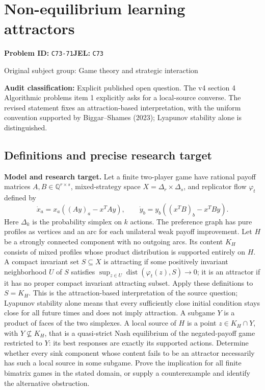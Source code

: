 \documentclass[11pt,a4paper]{article}
\begin{document}
\section*{Non-equilibrium learning attractors}
\textbf{Problem ID:} \texttt{C73-71}\quad \textbf{JEL:} \texttt{C73}\par
\label{problem:OP-0284}
{\sffamily\small\color{muted}Original subject group: Game theory and strategic interaction\par}
\label{definitions:problem:30007566}
\textbf{Audit classification:} Explicit published open question. The v4 section 4 Algorithmic problems item 1 explicitly asks for a local-source converse. The revised statement fixes an attraction-based interpretation, with the uniform convention supported by Biggar--Shames (2023); Lyapunov stability alone is distinguished.
\subsection*{Definitions and precise research target}
\textbf{Model and research target.} Let a finite two-player game have rational payoff matrices \(A,B\in\mathbb Q^{r\times s}\), mixed-strategy space \(X=\Delta_r\times\Delta_s\), and replicator flow \(\varphi_t\) defined by
\[
 \dot x_a=x_a((Ay)_a-x^TAy),\qquad
 \dot y_b=y_b((x^TB)_b-x^TBy).
\]
Here \(\Delta_k\) is the probability simplex on \(k\) actions. The preference graph has pure profiles as vertices and an arc for each unilateral weak payoff improvement. Let \(H\) be a strongly connected component with no outgoing arcs. Its content \(K_H\) consists of mixed profiles whose product distribution is supported entirely on \(H\). A compact invariant set \(S\subseteq X\) is attracting if some positively invariant neighborhood \(U\) of \(S\) satisfies \(\sup_{z\in U}\operatorname{dist}(\varphi_t(z),S)\to0\); it is an attractor if it has no proper compact invariant attracting subset. Apply these definitions to \(S=K_H\). This is the attraction-based interpretation of the source question; Lyapunov stability alone means that every sufficiently close initial condition stays close for all future times and does not imply attraction. A subgame \(Y\) is a product of faces of the two simplexes. A local source of \(H\) is a point \(z\in K_H\cap Y\), with \(Y\not\subseteq K_H\), that is a quasi-strict Nash equilibrium of the negated-payoff game restricted to \(Y\): its best responses are exactly its supported actions. Determine whether every sink component whose content fails to be an attractor necessarily has such a local source in some subgame. Prove the implication for all finite bimatrix games in the stated domain, or supply a counterexample and identify the alternative obstruction.
\end{document}
